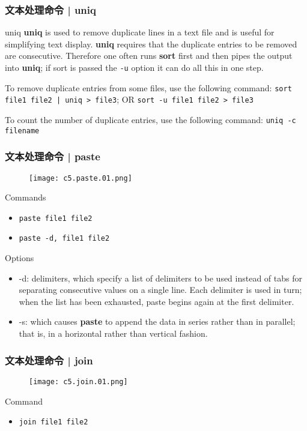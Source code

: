 \begin{frame}[fragile]
  \frametitle{文本处理命令 | uniq}
  \begin{block}{uniq}
    \textbf{uniq} is used to remove duplicate lines in a text file and is useful for simplifying text display. \textbf{uniq} requires that the duplicate entries to be removed are consecutive. Therefore one often runs \textbf{sort} first and then pipes the output into \textbf{uniq}; if sort is passed the \verb|-u| option it can do all this in one step. 

    To remove duplicate entries from some files, use the following command: \verb=sort file1 file2 | uniq > file3=; OR \verb|sort -u file1 file2 > file3|

    To count the number of duplicate entries, use the following command: \verb|uniq -c filename|
  \end{block}
\end{frame}

\begin{frame}[fragile]
  \frametitle{文本处理命令 | paste}
  \begin{figure}
    \centering
    \texttt{[image: c5.paste.01.png]}
  \end{figure}
  \pause
  \begin{block}{Commands}
    \begin{itemize}
      \item \verb|paste file1 file2|
      \item \verb|paste -d, file1 file2|
    \end{itemize}
  \end{block}
  \pause
  \begin{block}{Options}
    {\scriptsize
    \begin{itemize}
      \item -d: delimiters, which specify a list of delimiters to be used instead of tabs for separating consecutive values on a single line. Each delimiter is used in turn; when the list has been exhausted, paste begins again at the first delimiter.
      \item -s: which causes \textbf{paste} to append the data in series rather than in parallel; that is, in a horizontal rather than vertical fashion.
    \end{itemize}
    }
  \end{block}
\end{frame}

\begin{frame}[fragile]
  \frametitle{文本处理命令 | join}
  \begin{figure}
    \centering
    \texttt{[image: c5.join.01.png]}
  \end{figure}
  \pause
  \begin{block}{Command}
    \begin{itemize}
      \item \verb|join file1 file2|
    \end{itemize}
  \end{block}
\end{frame}


